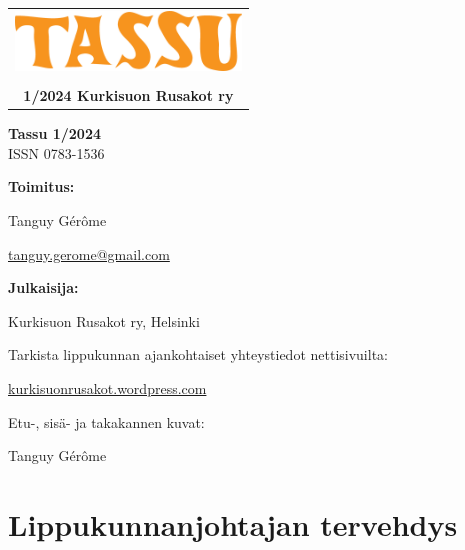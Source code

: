 \documentclass[10pt,finnish,a5paper,headings=small,twoside=semi]{scrartcl}
\begin{document}
\thispagestyle{empty}


\vspace*{5.70cm}

{\noindent\color{kuru}\begin{tabular}{@{}c@{}}
\includegraphics[width=6cm]{logo} \\
\\
{\large\bfseries 1/2024 Kurkisuon Rusakot ry}
\end{tabular}\par}

\clearpage


\noindent \textbf{Tassu 1/2024} \\
\noindent ISSN 0783-1536

\vfill

\begin{multicols}{2}
\noindent\textbf{Toimitus:}

Tanguy Gérôme

\href{mailto:tanguy.gerome@gmail.com}{tanguy.gerome@gmail.com}

\medskip

\noindent\textbf{Julkaisija:}

Kurkisuon Rusakot ry, Helsinki

\medskip

\noindent Tarkista lippukunnan ajankohtaiset yhteystiedot nettisivuilta:

\href{https://kurkisuonrusakot.wordpress.com/}{kurkisuonrusakot.wordpress.com}

\medskip

\noindent Etu-, sisä- ja takakannen kuvat:

Tanguy Gérôme

\columnbreak

\tableofcontents
\end{multicols}

\clearpage\section{Lippukunnanjohtajan tervehdys}

\end{document}
